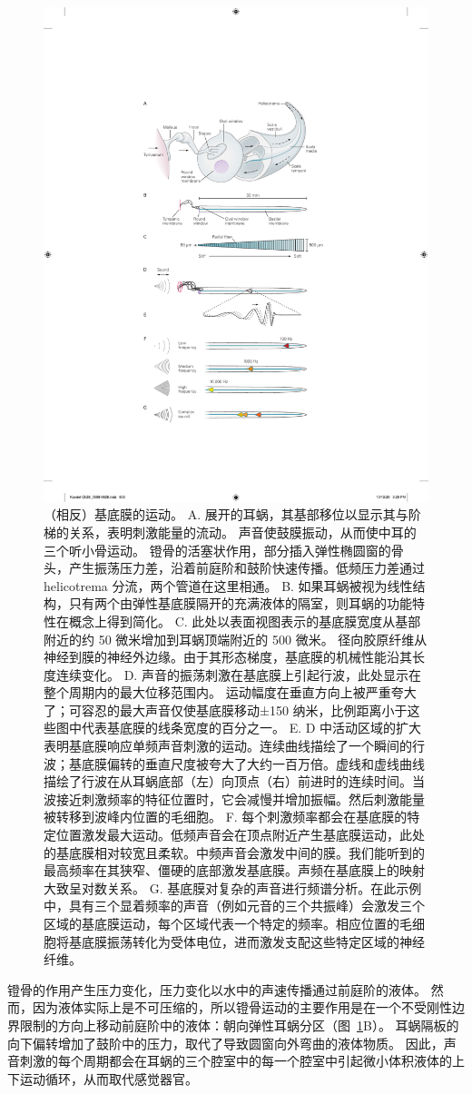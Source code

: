 \begin{figure}[htbp]
	\centering
	\includegraphics[width=0.5\linewidth]{chap26/fig_26_3}
	\caption{（相反）基底膜的运动。
		A. 展开的耳蜗，其基部移位以显示其与阶梯的关系，表明刺激能量的流动。
		声音使鼓膜振动，从而使中耳的三个听小骨运动。
		镫骨的活塞状作用，部分插入弹性椭圆窗的骨头，产生振荡压力差，沿着前庭阶和鼓阶快速传播。低频压力差通过 helicotrema 分流，两个管道在这里相通。
		B. 如果耳蜗被视为线性结构，只有两个由弹性基底膜隔开的充满液体的隔室，则耳蜗的功能特性在概念上得到简化。
		C. 此处以表面视图表示的基底膜宽度从基部附近的约 50 微米增加到耳蜗顶端附近的 500 微米。
		径向胶原纤维从神经到膜的神经外边缘。由于其形态梯度，基底膜的机械性能沿其长度连续变化。
		D. 声音的振荡刺激在基底膜上引起行波，此处显示在整个周期内的最大位移范围内。
		运动幅度在垂直方向上被严重夸大了；可容忍的最大声音仅使基底膜移动±150 纳米，比例距离小于这些图中代表基底膜的线条宽度的百分之一。
		E. D 中活动区域的扩大表明基底膜响应单频声音刺激的运动。连续曲线描绘了一个瞬间的行波；基底膜偏转的垂直尺度被夸大了大约一百万倍。虚线和虚线曲线描绘了行波在从耳蜗底部（左）向顶点（右）前进时的连续时间。当波接近刺激频率的特征位置时，它会减慢并增加振幅。然后刺激能量被转移到波峰内位置的毛细胞。
		F. 每个刺激频率都会在基底膜的特定位置激发最大运动。低频声音会在顶点附近产生基底膜运动，此处的基底膜相对较宽且柔软。中频声音会激发中间的膜。我们能听到的最高频率在其狭窄、僵硬的底部激发基底膜。声频在基底膜上的映射大致呈对数关系。
		G. 基底膜对复杂的声音进行频谱分析。在此示例中，具有三个显着频率的声音（例如元音的三个共振峰）会激发三个区域的基底膜运动，每个区域代表一个特定的频率。相应位置的毛细胞将基底膜振荡转化为受体电位，进而激发支配这些特定区域的神经纤维。}
	\label{fig:26_3}
\end{figure}


镫骨的作用产生压力变化，压力变化以水中的声速传播通过前庭阶的液体。
然而，因为液体实际上是不可压缩的，所以镫骨运动的主要作用是在一个不受刚性边界限制的方向上移动前庭阶中的液体：朝向弹性耳蜗分区（图~\ref{fig:26_3}B）。
耳蜗隔板的向下偏转增加了鼓阶中的压力，取代了导致圆窗向外弯曲的液体物质。
因此，声音刺激的每个周期都会在耳蜗的三个腔室中的每一个腔室中引起微小体积液体的上下运动循环，从而取代感觉器官。


